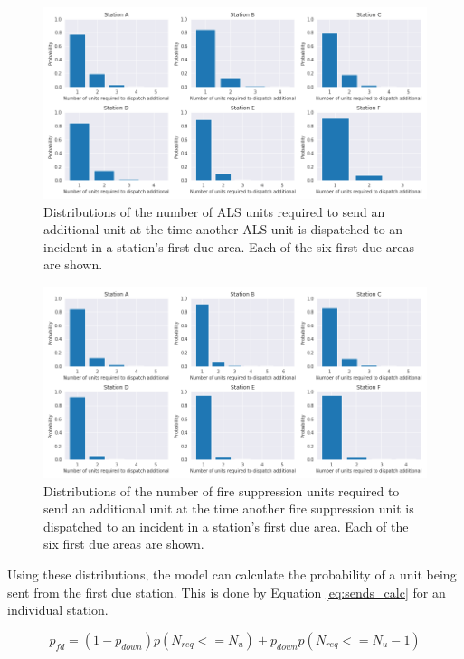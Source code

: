 \documentclass[article]{proc}
\begin{document}
\begin{figure}[!htb]
  \centering
  \includegraphics[width=16cm,keepaspectratio]{Figures/alsbar.png}
  \caption{Distributions of the number of ALS units required to send an additional unit at the time another ALS unit is dispatched to an incident in a station's first due area. Each of the six first due areas are shown.}
  \label{fig:alsbar}
\end{figure}

\begin{figure}[!htb]
  \centering
  \includegraphics[width=16cm,keepaspectratio]{Figures/firebar.png}
  \caption{Distributions of the number of fire suppression units required to send an additional unit at the time another fire suppression unit is dispatched to an incident in a station's first due area. Each of the six first due areas are shown.}
  \label{fig:firebar}
\end{figure}




Using these distributions, the model can calculate the probability of a unit being sent from the first due station. This is done by Equation \ref{eq:sends_calc} for an individual station.

\begin{equation}
p_{fd} = (1-p_{down})p(N_{req} <= N_u) 
+ p_{down}p(N_{req} <= N_u-1) 
\label{eq:sends_calc}
\end{equation}
\end{document}

